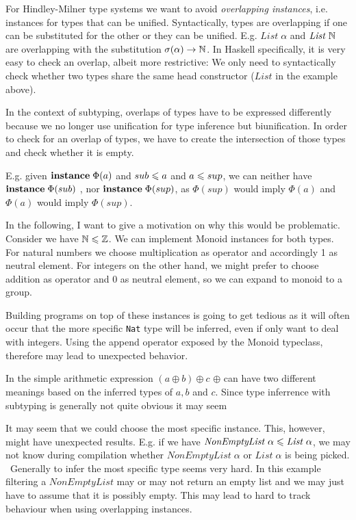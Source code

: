   For Hindley-Milner type systems we want to avoid \emph{overlapping instances}, i.e. instances for types that can be unified. \cite{peytonjones1997type}
  Syntactically, types are overlapping if one can be substituted for the other or they can be unified.
  E.g. $\mathit{List} \; \alpha$ and $\mathit{List} \; \mathbb{N}$ are overlapping with the substitution $\sigma(\alpha) \to \mathbb{N}$.
  In Haskell specifically, it is very easy to check an overlap, albeit more restrictive: We only need to syntactically check whether two types share the same head constructor ($\mathit{List}$ in the example above).

In the context of subtyping, overlaps of types have to be expressed differently because we no longer use unification for type inference but biunification.
In order to check for an overlap of types, we have to create the intersection of those types and check whether it is empty.

E.g. given ${\bf instance} \; \Phi(a)$ and $sub \leqslant a$ and $a \leqslant sup$, we can neither have ${\bf instance} \; \Phi(sub)$ , nor ${\bf instance} \; \Phi(sup)$,
as $\Phi(sup)$ would imply $\Phi(a)$ and $\Phi(a)$ would imply $\Phi(sup)$.

In the following, I want to give a motivation on why this would be problematic.
Consider we have $\mathbb{N} \leqslant \mathbb{Z}$.
We can implement Monoid instances for both types. For natural numbers we choose multiplication as operator and accordingly 1 as neutral element.
For integers on the other hand, we might prefer to choose addition as operator and 0 as neutral element, so we can expand to monoid to a group.

Building programs on top of these instances is going to get tedious as it will often occur that the more specific \texttt{Nat} type will be inferred,
even if only want to deal with integers.
Using the append operator exposed by the Monoid typeclass, therefore may lead to unexpected behavior.

In the simple arithmetic expression $(a \oplus b) \oplus c$ $\oplus$ can have two different meanings based on the inferred types of $a,b$ and $c$.
Since type inferrence with subtyping is generally not quite obvious it may seem

  It may seem that we could choose the most specific instance. This, however, might have unexpected results.
  E.g. if we have $\mathit{NonEmptyList} \; \alpha \leqslant \mathit{List} \; \alpha$, we may not know during compilation whether $\mathit{NonEmptyList} \; \alpha $ or $\mathit{List} \; \alpha$ is being picked.
  ~Generally to infer the most specific type seems very hard. In this example filtering a $\mathit{NonEmptyList}$ may or may not return an empty list and we may just have to assume that it is possibly empty.
  This may lead to hard to track behaviour when using overlapping instances.

